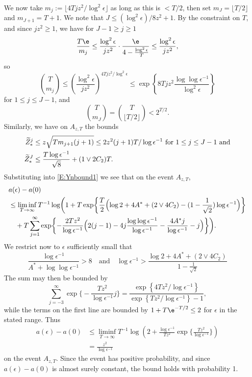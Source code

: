 \documentclass[11pt]{amsart}
\begin{document}
We now take $m_{j}:=\lfloor 4Tj z^{2}/ \log^{2}\epsilon \rfloor$ as long as this is $<T/2$,
then set $m_{J}=\lfloor T/2\rfloor$ and $m_{J+1}=T+1$. We note that $J\le ( \log^{2}\epsilon)/8z^{2} + 1 $.
By the constraint on $T$, and since $jz^2\ge 1$, we have for $J-1\ge j\ge 1$
$$
\frac{T\e}{m_{j}}\le \frac{\log^{2}\epsilon}{jz^{2}} \cdot \frac{\e}{4 -\frac{\log^{2}\epsilon}{T}}\le
  \frac{ \log^{2} \epsilon}{j z^{2}},
$$
so
$$
\binom{T}{m_{j}}\le \left(  \frac{ \log^{2} \epsilon}{j z^{2}} \right)^{4Tj z^{2}/\log^{2}\epsilon}
  \le \exp \left\{ 8Tj z^{2}\frac{\log\log \epsilon^{-1}}{\log^{2}\epsilon} \right\}
$$
for $1\le j \le J-1$, and 
$$
\binom{T}{m_J}=\binom{T}{\lfloor T/2\rfloor } < 2^{T/2}.
$$
Similarly, we have on $A_{z,T}$ the bounds
\begin{align*}
\widetilde{Z}_{*}^{j} &\le z\sqrt{Tm_{j+1}(j+1)}\le 2z^{2}(j+1)T/\log\epsilon^{-1} \text{ for } 1\le j \le J-1 \text{ and}\\
\widetilde{Z}_*^{J} & \le \frac{T \log \epsilon^{-1}}{\sqrt{8}} + (1\vee 2C_2) T.
\end{align*}
Substituting into \eqref{E:Ynbound1} we see that on the event $A_{z,T}$,
\begin{align*}
&a(\epsilon)-a(0)\\
&\le \liminf_{T\to\infty}T^{-1}\log \biggl( 1 +T \exp\biggl\{ \frac{T}{2} \Bigl( \log 2 +4 A^* +(2\vee 4C_2) - ( 1 -\frac{1}{\sqrt{2} })   \log \epsilon^{-1}\Bigr)\biggr\} \\
&\quad +T\sum_{j=1}^{\infty} 
	\exp \biggl\{ -\frac{2T z^2}{\log\epsilon^{-1}} \Bigl( 2(j-1) - 4j \frac{\log\log \epsilon^{-1}}{\log \epsilon^{-1}} - \frac{4A^*  j }{\log\epsilon^{-1}} - j  \Bigr)  \biggr\}  \biggr).
\end{align*}
We restrict now to $\epsilon$ sufficiently small that
\begin{equation} \label{E:epsilon_small}
\frac{\log \epsilon^{-1}}{A^*+ \log \log \epsilon^{-1}} > 8 \quad \text{and} \quad   \log \epsilon^{-1} > \frac{\log 2 +4 A^* +(2\vee 4C_2)}{1-\frac{1}{\sqrt{2}}}
\end{equation}
The sum may then be bounded by
$$
\sum_{j=-3}^\infty \exp\biggl\{ - \frac{Tz^{2}}{\log\epsilon^{-1}} j \biggr\}
  = \frac{ \exp\left\{ 4 Tz^{2}/\log\epsilon^{-1}  \right\} }{ \exp\left\{ Tz^{2}/\log\epsilon^{-1}  \right\} -1},
$$
while the terms on the first line are bounded by $1+ T \e^{-T/2} \le 2$
for $\epsilon$ in the stated range.
Thus
\begin{equation}  \label{E:Ynbound3}
\begin{split}
a(\epsilon)-a(0)
&\le \liminf_{T\to\infty}T^{-1}
  \log \left( 2 + \frac{\log \epsilon^{-1}}{T z^2} \exp\biggl\{ \frac{Tz^{2}}{\log\epsilon^{-1}}  \biggr\}\right)\\
  &=\frac{z^2}{\log\epsilon^{-1}}
\end{split}
\end{equation}
on the event $A_{z,T}$. Since the event has positive probability, and since
$a(\epsilon)-a(0)$ is almost surely constant, the bound holds with probability 1.
\end{document}
